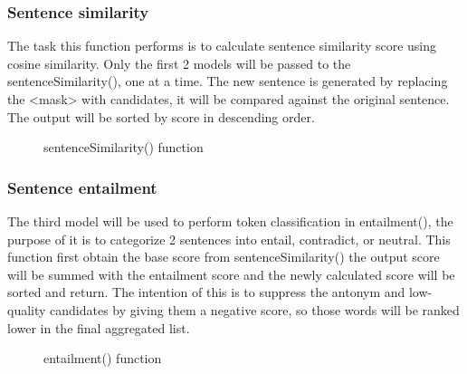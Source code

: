 \documentclass[12pt,oneside,openright,a4paper]{cpe-english-project}
\begin{document}
\subsubsection{Sentence similarity }
The task this function performs is to calculate sentence similarity score using cosine similarity. Only the first 2 models will be passed to the sentenceSimilarity(), one at a time. The new sentence is generated by replacing the <mask> with candidates, it will be compared against the original sentence. The output will be sorted by score in descending order.
\begin{figure}[!h]\centering
\setlength{\fboxrule}{0.2mm} %
\setlength{\fboxsep}{1cm}
\caption{sentenceSimilarity() function}\label{fig:sentenceSimilarity() function}
\end{figure}


\subsubsection{Sentence entailment}
The third model will be used to perform token classification in entailment(), the purpose of it is to categorize 2 sentences into entail, contradict, or neutral. 
This function first obtain the base score from sentenceSimilarity() the output score will be summed with the entailment score and the newly calculated score will be sorted and return. The intention of this is to suppress the antonym and low-quality candidates by giving them a negative score, so those words will be ranked lower in the final aggregated list.
\begin{figure}[!h]\centering
\setlength{\fboxrule}{0.2mm} %
\setlength{\fboxsep}{1cm}
\caption{entailment() function}\label{fig:entailment() function}
\end{figure}
\end{document}
